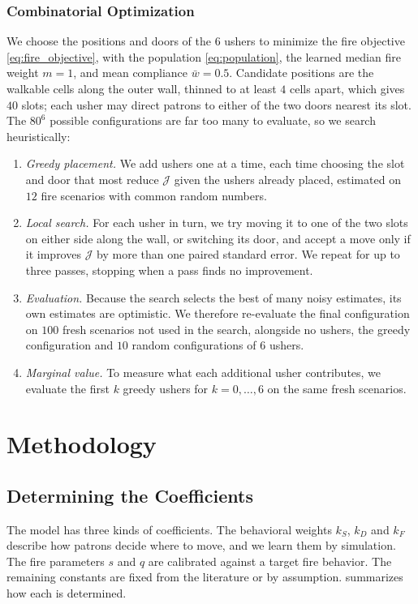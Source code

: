 \documentclass[14pt]{article}
\theoremstyle{definition}
\begin{document}
\subsubsection{Combinatorial Optimization}\label{sec:combinatorial}
We choose the positions and doors of the $6$ ushers to minimize the fire objective
\cref{eq:fire_objective}, with the population \cref{eq:population}, the learned median
fire weight $m = 1$, and mean compliance $\bar w = 0.5$. Candidate positions are the
walkable cells along the outer wall, thinned to at least $4$ cells apart, which gives
$40$ slots; each usher may direct patrons to either of the two doors nearest its slot.
The $80^6$ possible configurations are far too many to evaluate, so we search
heuristically:
\begin{enumerate}
  \item \emph{Greedy placement.} We add ushers one at a time, each time choosing the
  slot and door that most reduce $\mathcal{J}$ given the ushers already placed,
  estimated on $12$ fire scenarios with common random numbers.
  \item \emph{Local search.} For each usher in turn, we try moving it to one of the two
  slots on either side along the wall, or switching its door, and accept a move only if
  it improves $\mathcal{J}$ by more than one paired standard error. We repeat for up to
  three passes, stopping when a pass finds no improvement.
  \item \emph{Evaluation.} Because the search selects the best of many noisy estimates,
  its own estimates are optimistic. We therefore re-evaluate the final configuration on
  $100$ fresh scenarios not used in the search, alongside no ushers, the greedy
  configuration and $10$ random configurations of $6$ ushers.
  \item \emph{Marginal value.} To measure what each additional usher contributes, we
  evaluate the first $k$ greedy ushers for $k = 0, \dots, 6$ on the same fresh
  scenarios.
\end{enumerate}

\newpage
\section{Methodology}
\subsection{Determining the Coefficients}\label{sec:coefficients}

The model has three kinds of coefficients. The behavioral weights $k_S$, $k_D$ and $k_F$
describe how patrons decide where to move, and we learn them by simulation. The fire
parameters $s$ and $q$ are calibrated against a target fire behavior. The remaining
constants are fixed from the literature or by assumption.
 summarizes how each is determined.
\end{document}
